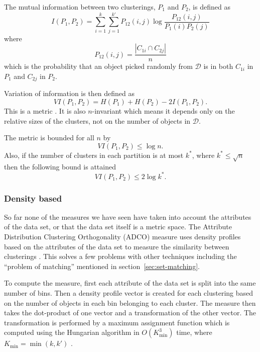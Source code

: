 \documentclass[a4paper]{report}
\begin{document}
The mutual information between two clusterings, $P_1$ and $P_2$, is defined as
\begin{equation*}
  I(P_1,P_2) = \sum_{i=1}^{k} \sum_{j=1}^{k'} P_{12}(i,j)
  \log \frac{P_{12}(i,j)}{P_{1}(i) P_{2}(j)}
\end{equation*}
where
\begin{equation*}
  P_{12}(i,j) = \frac{|C_{1i} \cap C_{2j}|}{n}
\end{equation*}
which is the probability that an object picked randomly from $\mathcal{D}$ is
in both $C_{1i}$ in $P_1$ and $C_{2j}$ in $P_2$.

Variation of information is then defined as
\begin{equation*}
  VI(P_1,P_2) = H(P_1) + H(P_2) - 2I(P_1,P_2).
\end{equation*}
This is a metric \citep{meila-2007}.  It is also $n$-invariant which means it
depends only on the relative sizes of the clusters, not on the number of
objects in $\mathcal{D}$.

The metric is bounded for all $n$ by
\begin{equation*}
  VI(P_1,P_2) \leq \log n.
\end{equation*}
Also, if the number of clusters in each partition is at most $k^{*}$, where
$k^{*} \leq \sqrt{n}$ then the following bound is attained
\begin{equation*}
  VI(P_1,P_2) \leq 2 \log k^{*}.
\end{equation*}

\subsubsection{Density based}
\label{sec:density-based}

So far none of the measures we have seen have taken into account the
attributes of the data set, or that the data set itself is a metric space.
The Attribute Distribution Clustering Orthogonality (ADCO) measure uses
density profiles based on the attributes of the data set to measure the
similarity between clusterings \citep{bae-2010}.  This solves a few problems
with other techniques including the ``problem of matching'' mentioned in
section~\ref{sec:set-matching}.

To compute the measure, first each attribute of the data set is split into the
same number of bins.  Then a density profile vector is created for each
clustering based on the number of objects in each bin belonging to each
cluster.  The measure then takes the dot-product of one vector and a
transformation of the other vector.  The transformation is performed by a
maximum assignment function which is computed using the Hungarian algorithm in
$O(K_{\min}^3)$ time, where $K_{\min} = \min(k,k')$ \citep{bae-2010}.
\end{document}
